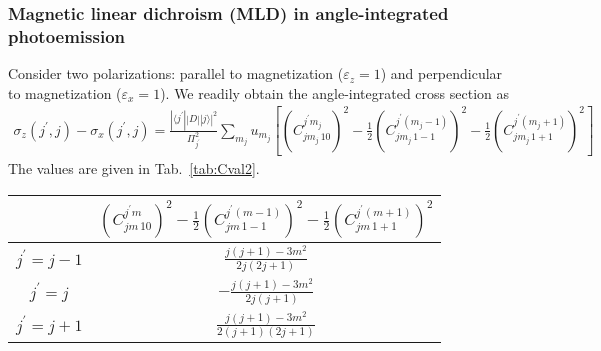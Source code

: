 \documentclass[a4paper,oneside,12pt]{extarticle}
\begin{document}
\subsubsection {Magnetic linear dichroism (MLD) in angle-integrated photoemission}
%
Consider two polarizations: parallel to magnetization ($\varepsilon_z=1$) and perpendicular to magnetization ($\varepsilon_x=1$). We readily obtain the angle-integrated cross section as
%
\begin{multline}
\sigma_z(j^{\prime},j) - \sigma_x(j^{\prime},j) = 
\frac{|\langle j^{\prime} || D || j \rangle|^2}{\Pi_{j^{\prime}}^2} \sum_{m_j} u_{m_j}
\left[ \left( C_{j m_j \, 1 0}^{j^{\prime} m_j}\right)^2 -
\frac{1}{2}\left( C_{j m_j \, 1 -1}^{j^{\prime} (m_j-1)}\right)^2 - \frac{1}{2}\left(C_{j m_j \, 1 +1}^{j^{\prime} (m_j+1)}\right)^2 \right]
\end{multline}
%
The values are given in Tab.~\ref{tab:Cval2}.
%
\begin{table*}[h]
	\begin{center}
		\begin{tabular}{c|c}
   & $ \left( C_{j m \, 1 0}^{j^{\prime} m}\right)^2 -
\frac{1}{2}\left( C_{j m \, 1 -1}^{j^{\prime} (m-1)}\right)^2 - \frac{1}{2}\left(C_{j m \, 1 +1}^{j^{\prime} (m+1)}\right)^2$ \\
\hline	
$j^{\prime} = j-1$ & \large $\frac{j(j+1)-3m^2}{2j(2j+1)}$ \\
\hline
$j^{\prime} = j$ & \large $-\frac{j(j+1)-3m^2}{2j(j+1)}$ \\
\hline
$j^{\prime} = j+1$ & \large $\frac{j(j+1)-3m^2}{2(j+1)(2j+1)}$
		\end{tabular}
	\end{center}
	\caption{Values of coefficient.}
	\label{tab:Cval2}
\end{table*}
\end{document}
